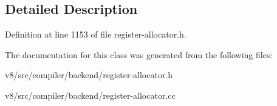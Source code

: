 \subsection{Detailed Description}


Definition at line 1153 of file register-\/allocator.\+h.



The documentation for this class was generated from the following files\+:\begin{DoxyCompactItemize}
\item 
v8/src/compiler/backend/register-\/allocator.\+h\item 
v8/src/compiler/backend/register-\/allocator.\+cc\end{DoxyCompactItemize}
